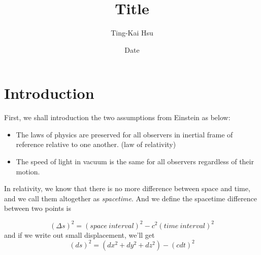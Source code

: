 \documentclass[12pt]{article}
\title{Title}
\author{Ting-Kai Hsu}
\date{Date}
\begin{document}
\section{Introduction}

First, we shall introduction the two assumptions from Einstein as below:

\begin{itemize}
    \item The laws of physics are preserved for all observers in inertial frame of reference relative to one another. (law of relativity)
    \item The speed of light in vacuum is the same for all observers regardless of their motion.
\end{itemize}

In relativity, we know that there is no more difference between space and time, and we call them altogether as \textit{spacetime}. And we define the spacetime difference between two points is 

\begin{center}
    \[ (\Delta s)^2 = (space\ interval)^2 - c^2(time\ interval)^2 \]
    and if we write out small displacement, we'll get
    \[ (ds)^2 = (dx^2 + dy^2 + dz^2) - (cdt)^2  \]
\end{center}
\end{document}
